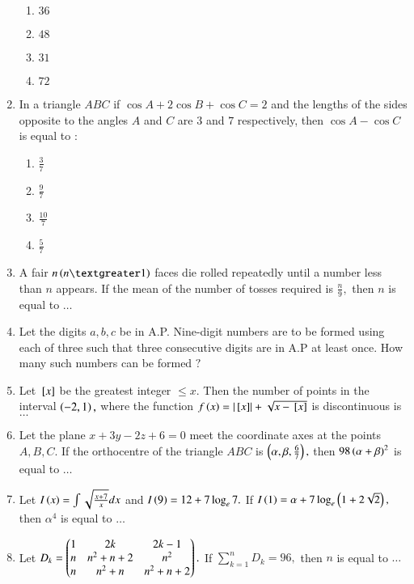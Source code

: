 \documentclass[journal,12pt,twocolumn]{IEEEtran}
\theoremstyle{remark}
\begin{document}
\begin{enumerate}[start=16]
    \begin{enumerate}
        \item $36$
        \item $48$
        \item $31$
        \item $72$
    \end{enumerate}
    \item In a triangle $ABC$ if $\cos A+2\cos B+\cos C=2$ and the lengths of the sides opposite to the angles $A$ and $C$ are $3$ and $7$ respectively, then $\cos A-\cos C$ is equal to $:$\\
    \begin{enumerate}
        \item $\frac{3}{7}$
        \item $\frac{9}{7}$
        \item $\frac{10}{7}$
        \item $\frac{5}{7}$
    \end{enumerate}
    \item A fair $n\brak{n \textgreater 1}$ faces die rolled repeatedly until a number less than $n$ appears. If the mean of the number of tosses required is $\frac{n}{9},$ then $n$ is equal to $\dots$\\
    \item Let the digits $a,b,c$ be in A.P. Nine-digit numbers are to be formed using each of three such that three consecutive digits are in A.P at least once. How many such numbers can be formed $?$\\
    \item Let ${}\left[x\right]$ be the greatest integer $\le x.$ Then the number of points in the interval $\left(-2,1\right),$ where the function $f\left(x\right)=\left\vert{}\left[x\right]\right\vert+\sqrt{x-{}\left[x\right]}$ is discontinuous is $\dots$\\
    \item Let the plane $x+3y-2z+6=0$ meet the coordinate axes at the points $A,B,C.$ If the orthocentre of the triangle $ABC$ is $\left(\alpha,\beta,\frac{6}{7}\right),$ then $98\left(\alpha+\beta\right)^2$ is equal to $\dots$\\
    \item Let $I\left(x\right)=\int\sqrt{\frac{x+7}{x}}dx$ and $I\left(9\right)=12+7\log_e7.$ If $I\left(1\right)=\alpha+7\log_e\left(1+2\sqrt{2}\right),$ then $\alpha ^4$ is equal to $\dots$\\
    \item Let $D_k=\begin{pmatrix}1&2k&2k-1\\n&n^2+n+2&n^2\\n&n^2+n&n^2+n+2\end{pmatrix}.$ If $\sum_{k=1}^nD_k=96,$ then $n$ is equal to $\dots$\\

\end{enumerate}
\end{document}
